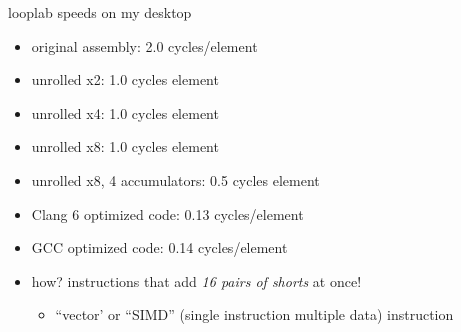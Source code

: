 \begin{frame}{looplab speeds on my desktop}
    \begin{itemize}
    \item original assembly: 2.0 cycles/element
    \item unrolled x2: 1.0 cycles element
    \item unrolled x4: 1.0 cycles element
    \item unrolled x8: 1.0 cycles element
    \item unrolled x8, 4 accumulators: 0.5 cycles element
    \vspace{.5cm}
    \item<2-> Clang 6 optimized code: 0.13 cycles/element
    \item<2-> GCC optimized code: 0.14 cycles/element
    \vspace{.5cm}
    \item<3-> how? instructions that add \textit{16 pairs of shorts} at once!
        \begin{itemize}
            \item ``vector' or ``SIMD'' {\scriptsize(single instruction multiple data)} instruction
        \end{itemize}
    \end{itemize}
\end{frame}
